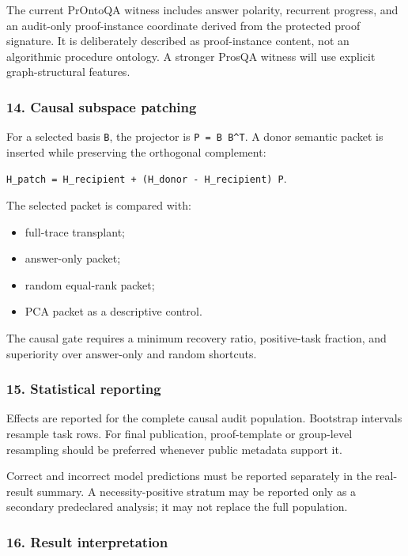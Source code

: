 \documentclass[
  10pt,
]{article}
\providecommand{\tightlist}{%
  \setlength{\itemsep}{0pt}\setlength{\parskip}{0pt}}
\begin{document}
The current PrOntoQA witness includes answer polarity, recurrent
progress, and an audit-only proof-instance coordinate derived from the
protected proof signature. It is deliberately described as
proof-instance content, not an algorithmic procedure ontology. A
stronger ProsQA witness will use explicit graph-structural features.

\subsubsection{14. Causal subspace
patching}\label{causal-subspace-patching}

For a selected basis \texttt{B}, the projector is
\texttt{P\ =\ B\ B\^{}T}. A donor semantic packet is inserted while
preserving the orthogonal complement:

\texttt{H\_patch\ =\ H\_recipient\ +\ (H\_donor\ -\ H\_recipient)\ P}.

The selected packet is compared with:

\begin{itemize}
\tightlist
\item
  full-trace transplant;
\item
  answer-only packet;
\item
  random equal-rank packet;
\item
  PCA packet as a descriptive control.
\end{itemize}

The causal gate requires a minimum recovery ratio, positive-task
fraction, and superiority over answer-only and random shortcuts.

\subsubsection{15. Statistical reporting}\label{statistical-reporting}

Effects are reported for the complete causal audit population. Bootstrap
intervals resample task rows. For final publication, proof-template or
group-level resampling should be preferred whenever public metadata
support it.

Correct and incorrect model predictions must be reported separately in
the real-result summary. A necessity-positive stratum may be reported
only as a secondary predeclared analysis; it may not replace the full
population.

\subsubsection{16. Result interpretation}\label{result-interpretation}
\end{document}

